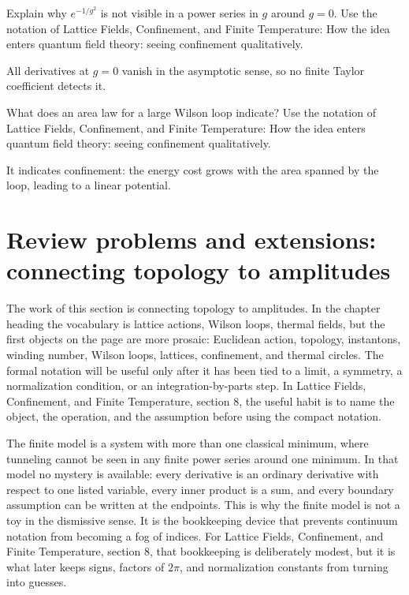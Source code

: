 \begin{exercise}
Explain why \(e^{-1/g^2}\) is not visible in a power series in \(g\) around \(g=0\).  Use the notation of Lattice Fields, Confinement, and Finite Temperature: How the idea enters quantum field theory: seeing confinement qualitatively.
\begin{answer}
All derivatives at \(g=0\) vanish in the asymptotic sense, so no finite Taylor coefficient detects it.
\end{answer}
\end{exercise}

\begin{exercise}
What does an area law for a large Wilson loop indicate?  Use the notation of Lattice Fields, Confinement, and Finite Temperature: How the idea enters quantum field theory: seeing confinement qualitatively.
\begin{answer}
It indicates confinement: the energy cost grows with the area spanned by the loop, leading to a linear potential.
\end{answer}
\end{exercise}



\section{Review problems and extensions: connecting topology to amplitudes}

The work of this section is connecting topology to amplitudes.  In the chapter heading the vocabulary is lattice actions, Wilson loops, thermal fields, but the first objects on the page are more prosaic: Euclidean action, topology, instantons, winding number, Wilson loops, lattices, confinement, and thermal circles.  The formal notation will be useful only after it has been tied to a limit, a symmetry, a normalization condition, or an integration-by-parts step.  In Lattice Fields, Confinement, and Finite Temperature, section 8, the useful habit is to name the object, the operation, and the assumption before using the compact notation.

The finite model is a system with more than one classical minimum, where tunneling cannot be seen in any finite power series around one minimum.  In that model no mystery is available: every derivative is an ordinary derivative with respect to one listed variable, every inner product is a sum, and every boundary assumption can be written at the endpoints.  This is why the finite model is not a toy in the dismissive sense.  It is the bookkeeping device that prevents continuum notation from becoming a fog of indices.  For Lattice Fields, Confinement, and Finite Temperature, section 8, that bookkeeping is deliberately modest, but it is what later keeps signs, factors of \(2\pi\), and normalization constants from turning into guesses.

